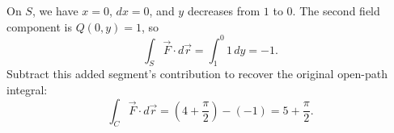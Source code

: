 \documentclass[12pt]{exam}
\begin{document}
\begin{enumerate}
\medskip
On $S$, we have $x=0$, $dx=0$, and $y$ decreases from $1$ to $0$.
The second field component is $Q(0,y)=1$, so
\[
  \int_S\vec F\cdot d\vec r=\int_1^0 1\,dy=-1.
\]
Subtract this added segment's contribution to recover the original
open-path integral:
\[
  \int_C\vec F\cdot d\vec r
   =\left(4+\frac{\pi}{2}\right)-(-1)
   =5+\frac{\pi}{2}.
\]

\end{enumerate}
\end{document}
